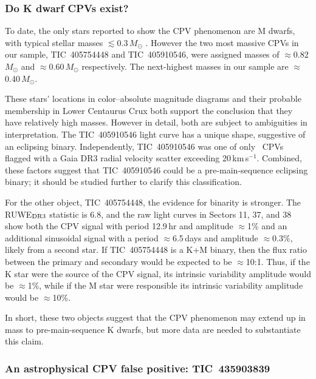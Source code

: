 \documentclass[11pt,twocolumn,tighten]{aastex63}
\newcommand{\kms}{{km\,s$^{-1}$}}
\begin{document}
\subsubsection{Do K dwarf CPVs exist?}
\label{subsec:massive}

To date, the only stars reported to show the CPV phenomenon are M
dwarfs, with typical stellar masses $\lesssim$0.3\,$M_\odot$
\citep{2017AJ....153..152S,2022AJ....163..144G}.  However the two most
massive CPVs in our sample, TIC~405754448 and TIC~405910546, were
assigned masses of $\approx$0.82\,$M_\odot$ and
$\approx$0.60\,$M_\odot$ respectively.  The next-highest masses in our
sample are $\approx$0.40\,$M_\odot$.

These stars' locations in color--absolute magnitude diagrams and
their probable membership in Lower Centaurus Crux both support the
conclusion that they have relatively high masses.
However in detail, both are subject to ambiguities
in interpretation.  The TIC~405910546 light curve has a unique shape,
suggestive of an eclipsing binary.  Independently, TIC~405910546 was
one of only \nrvscatterflag\ CPVs flagged with a Gaia DR3 radial
velocity scatter exceeding 20\,\kms.  Combined, these factors suggest
that TIC~405910546 could be a pre-main-sequence eclipsing binary; it
should be studied further to clarify this classification.

For the other object, TIC~405754448, the evidence for binarity is
stronger.  The RUWE$_{\rm DR3}$ statistic is 6.8, and the raw light
curves in Sectors 11, 37, and 38 show both the CPV signal with period
12.9\,hr and amplitude $\approx$1\% and an additional sinusoidal
signal with a period $\approx$6.5\,days and amplitude $\approx$0.3\%,
likely from a second star.  If TIC~405754448 is a K+M binary, then the
flux ratio between the primary and secondary would be expected to be
$\approx$10:1.  Thus, if the K star were the source of the CPV signal,
its intrinsic variability amplitude would be $\approx$1\%, while if
the M star were responsible its intrinsic variability amplitude would
be $\approx$10\%.

In short, these two objects suggest that the CPV phenomenon may extend
up in mass to pre-main-sequence K dwarfs, but more data are needed to
substantiate this claim.


\subsubsection{An astrophysical CPV false positive: TIC~435903839}
\end{document}
